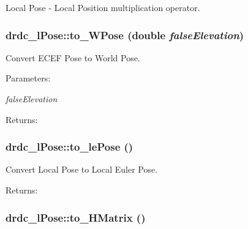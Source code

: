 Local Pose - Local Position multiplication operator. 

\hypertarget{classdrdc__lPose_62422847e77d7bfccb2c2c00d5cb8f44}{
\subsubsection[to\_\-WPose]{ drdc\_\-lPose::to\_\-WPose (double {\em falseElevation})}}
\label{classdrdc__lPose_62422847e77d7bfccb2c2c00d5cb8f44}


Convert ECEF Pose to World Pose. 

\begin{Desc}
\item[Parameters:]
\begin{description}
\item[{\em falseElevation}]\end{description}
\end{Desc}
\begin{Desc}
\item[Returns:]\end{Desc}
\hypertarget{classdrdc__lPose_d56ee6ffecee2d6f760a2fca99e2b503}{
\subsubsection[to\_\-lePose]{ drdc\_\-lPose::to\_\-lePose ()}}
\label{classdrdc__lPose_d56ee6ffecee2d6f760a2fca99e2b503}


Convert Local Pose to Local Euler Pose. 

\begin{Desc}
\item[Returns:]\end{Desc}
\hypertarget{classdrdc__lPose_7461c5f2274e0fa6c3ade454e44c74cf}{
\subsubsection[to\_\-HMatrix]{ drdc\_\-lPose::to\_\-HMatrix ()}}
\label{classdrdc__lPose_7461c5f2274e0fa6c3ade454e44c74cf}


